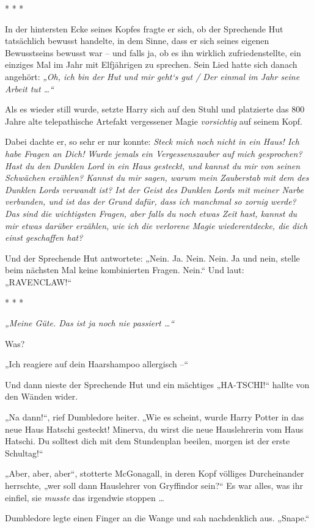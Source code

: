 {* * *

In der hintersten Ecke seines Kopfes fragte er sich, ob der Sprechende Hut tatsächlich bewusst handelte, in dem Sinne, dass er sich seines eigenen Bewusstseins bewusst war -- und falls ja, ob es ihn wirklich zufriedenstellte, ein einziges Mal im Jahr mit Elfjährigen zu sprechen. Sein Lied hatte sich danach angehört: \emph{„Oh, ich bin der Hut und mir geht`s gut / Der einmal im Jahr seine Arbeit tut …“}

Als es wieder still wurde, setzte Harry sich auf den Stuhl und platzierte das 800 Jahre alte telepathische Artefakt vergessener Magie \emph{vorsichtig} auf seinem Kopf.

Dabei dachte er, so sehr er nur konnte: \emph{Steck mich noch nicht in ein Haus! Ich habe Fragen an Dich! Wurde jemals ein Vergessenszauber auf mich gesprochen? Hast du den Dunklen Lord in ein Haus gesteckt, und kannst du mir von seinen Schwächen erzählen? Kannst du mir sagen, warum mein Zauberstab mit dem des Dunklen Lords verwandt ist? Ist der Geist des Dunklen Lords mit meiner Narbe verbunden, und ist das der Grund dafür, dass ich manchmal so zornig werde? Das sind die wichtigsten Fragen, aber falls du noch etwas Zeit hast, kannst du mir etwas darüber erzählen, wie ich die verlorene Magie wiederentdecke, die dich einst geschaffen hat?}

Und der Sprechende Hut antwortete: „Nein. Ja. Nein. Nein. Ja und nein, stelle beim nächsten Mal keine kombinierten Fragen. Nein.“ Und laut: „RAVENCLAW!“

* * *

\emph{„Meine Güte. Das ist ja noch nie passiert …“}

Was?

„Ich reagiere auf dein Haarshampoo allergisch --“

Und dann nieste der Sprechende Hut und ein mächtiges „HA-TSCHI!“ hallte von den Wänden wider.

„Na dann!“, rief Dumbledore heiter. „Wie es scheint, wurde Harry Potter in das neue Haus Hatschi gesteckt! Minerva, du wirst die neue Hauslehrerin vom Haus Hatschi. Du solltest dich mit dem Stundenplan beeilen, morgen ist der erste Schultag!“

„Aber, aber, aber“, stotterte McGonagall, in deren Kopf völliges Durcheinander herrschte, „wer soll dann Hauslehrer von Gryffindor sein?“ Es war alles, was ihr einfiel, sie \emph{musste} das irgendwie stoppen …

Dumbledore legte einen Finger an die Wange und sah nachdenklich aus. „Snape.“

}
